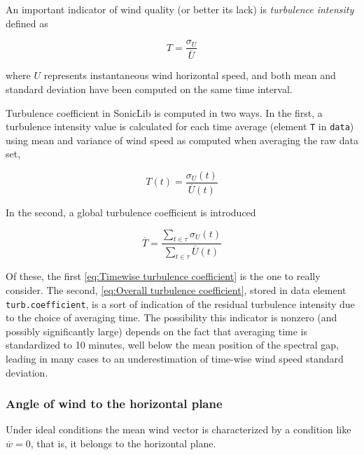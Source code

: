 \documentclass[a4paper,10pt]{book}
\begin{document}
An important indicator of wind quality (or better its lack) is \emph{turbulence intensity} defined as

\begin{equation}\label{eq:Turbulence intensity}
  T = \frac{\sigma_{U}}{\overline{U}}
\end{equation}

\noindent where $U$ represents instantaneous wind horizontal speed, and both mean and standard deviation have been computed on the same time interval.

Turbulence coefficient in SonicLib is computed in two ways. In the first, a turbulence intensity value is calculated for each time average (element \verb|T| in \verb|data|) using mean and variance of wind speed as computed when averaging the raw data set,

\begin{equation}\label{eq:Timewise turbulence coefficient}
  T\left( t \right) = \frac{\sigma_{U}\left( t \right) }{\overline{U}\left( t \right) }
\end{equation}

\noindent In the second, a global turbulence coefficient is introduced

\begin{equation}\label{eq:Overall turbulence coefficient}
  \overline{T} = \frac{\sum_{t \in \tau}\sigma_{U}\left( t \right) }{\sum_{t \in \tau}\overline{U}\left( t \right) }
\end{equation}

Of these, the first \ref{eq:Timewise turbulence coefficient} is the one to really consider. The second, \ref{eq:Overall turbulence coefficient}, stored in data element \verb|turb.coefficient|, is a sort of indication of the residual turbulence intensity due to the choice of averaging time. The possibility this indicator is nonzero (and possibly significantly large) depends on the fact that averaging time is standardized to 10 minutes, well below the mean position of the spectral gap, leading in many cases to an underestimation of time-wise wind speed standard deviation.

\subsubsection{Angle of wind to the horizontal plane}

Under ideal conditions the mean wind vector is characterized by a condition like $\overline{w} = 0$, that is, it belongs to the horizontal plane. 
\end{document}
